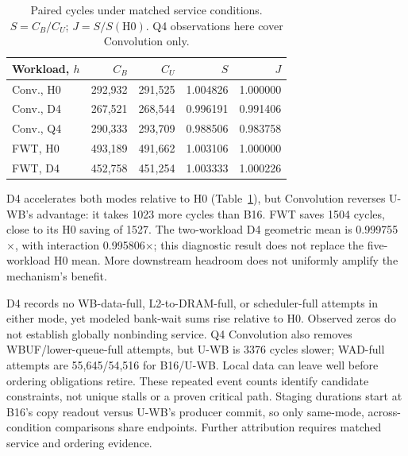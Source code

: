 \begin{table}[t]
\caption{Paired cycles under matched service conditions. $S=C_B/C_U$; $J=S/S(\mathrm{H0})$. Q4 observations here cover Convolution only.}
\label{tab:downstreamresults}\centering\footnotesize
\begin{tabular}{@{}lrrrr@{}}
\toprule
Workload, $h$ & $C_B$ & $C_U$ & $S$ & $J$ \\
\midrule
Conv., H0 & 292,932 & 291,525 & 1.004826 & 1.000000 \\
Conv., D4 & 267,521 & 268,544 & 0.996191 & 0.991406 \\
Conv., Q4 & 290,333 & 293,709 & 0.988506 & 0.983758 \\
FWT, H0 & 493,189 & 491,662 & 1.003106 & 1.000000 \\
FWT, D4 & 452,758 & 451,254 & 1.003333 & 1.000226 \\
\bottomrule
\end{tabular}
\end{table}

D4 accelerates both modes relative to H0 (Table~\ref{tab:downstreamresults}), but Convolution reverses U-WB's advantage: it takes 1023 more cycles than B16. FWT saves 1504 cycles, close to its H0 saving of 1527. The two-workload D4 geometric mean is 0.999755$\times$, with interaction 0.995806$\times$; this diagnostic result does not replace the five-workload H0 mean. More downstream headroom does not uniformly amplify the mechanism's benefit.

D4 records no WB-data-full, L2-to-DRAM-full, or scheduler-full attempts in either mode, yet modeled bank-wait sums rise relative to H0. Observed zeros do not establish globally nonbinding service. Q4 Convolution also removes WBUF/lower-queue-full attempts, but U-WB is 3376 cycles slower; WAD-full attempts are 55,645/54,516 for B16/U-WB. Local data can leave well before ordering obligations retire. These repeated event counts identify candidate constraints, not unique stalls or a proven critical path. Staging durations start at B16's copy readout versus U-WB's producer commit, so only same-mode, across-condition comparisons share endpoints. Further attribution requires matched service and ordering evidence.

